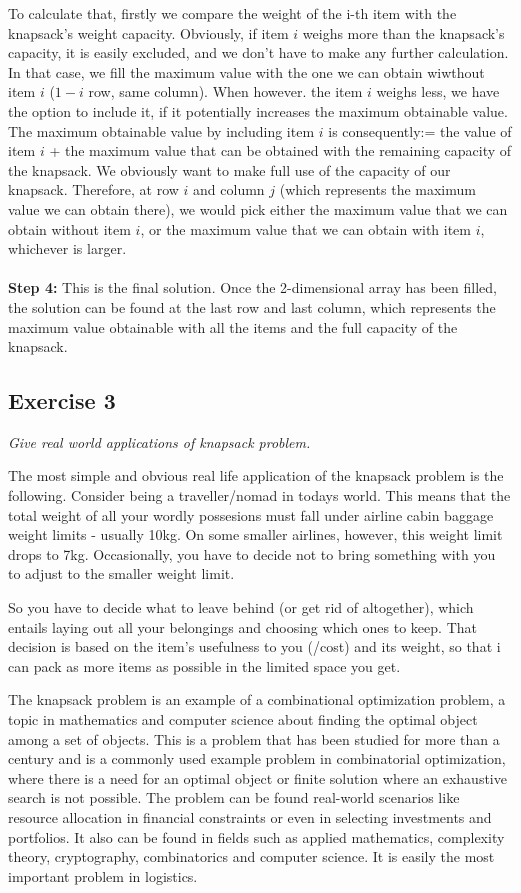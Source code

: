 \documentclass[12pt]{article}
\begin{document}
To calculate that, firstly we compare the weight of the i-th item with the knapsack's weight capacity. Obviously, if item $i$ weighs more than the knapsack's capacity, it is easily excluded, and we don't have to make any further calculation. In that case, we fill the maximum value with the one we can obtain wiwthout item $i$ ($1-i$ row, same column). When however. the item $i$ weighs less, we have the option to include it, if it potentially increases the maximum obtainable value. The maximum obtainable value by including item $i$ is consequently:= the value of item $i$ + the maximum value that can be obtained with the remaining capacity of the knapsack. We obviously want to make full use of the capacity of our knapsack. Therefore, at row $i$ and column $j$ (which represents the maximum value we can obtain there), we would pick either the maximum value that we can obtain without item $i$, or the maximum value that we can obtain with item $i$, whichever is larger. \\ \\ 
\textbf{Step 4:} This is the final solution. Once the 2-dimensional array has been filled, the solution can be found at the last row and last column, which represents the maximum value obtainable with all the items and the full capacity of the knapsack.
\newpage

\subsection*{Exercise 3}
\textit{Give real world applications of knapsack problem.}\newline

The most simple and obvious real life application of the knapsack problem is the following. Consider being a traveller/nomad in todays world. This means that the total weight of all your wordly possesions must fall under airline cabin baggage weight limits - usually 10kg. On some smaller airlines, however, this weight limit drops to 7kg. Occasionally, you have to decide not to bring something with you to adjust to the smaller weight limit. \par
So you have to decide what to leave behind (or get rid of altogether), which entails laying out all your belongings and choosing which ones to keep. That decision is based on the item's usefulness to you (/cost) and its weight, so that i can pack as more items as possible in the limited space you get.

The knapsack problem is an example of a combinational optimization problem, a topic in mathematics and computer science about finding the optimal object among a set of objects. This is a problem that has been studied for more than a century and is a commonly used example problem in combinatorial optimization, where there is a need for an optimal object or finite solution where an exhaustive search is not possible. The problem can be found real-world scenarios like resource allocation in financial constraints or even in selecting investments and portfolios. It also can be found in fields such as applied mathematics, complexity theory, cryptography, combinatorics and computer science. It is easily the most important problem in logistics.
\end{document}
